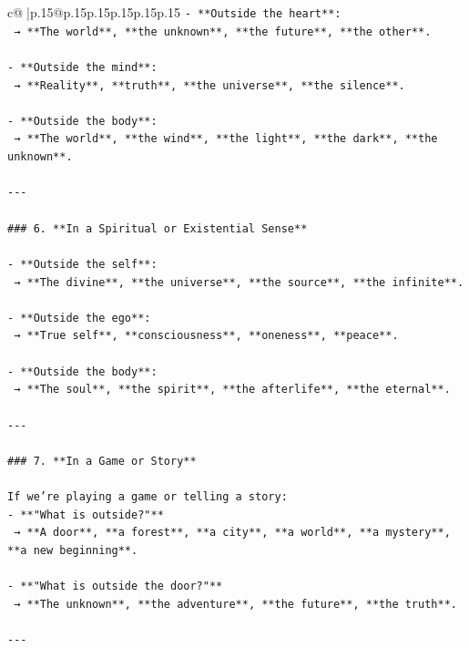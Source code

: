 \documentclass{article}
\begin{document}
{\begin{supertabular}{c@{$\;$}|p{.15\linewidth}@{}p{.15\linewidth}p{.15\linewidth}p{.15\linewidth}p{.15\linewidth}p{.15\linewidth}}
{{{\texttt{{-} **Outside the heart**:  } \\
\texttt{  → **The world**, **the unknown**, **the future**, **the other**.} \\
\\ 
\texttt{{-} **Outside the mind**:  } \\
\texttt{  → **Reality**, **truth**, **the universe**, **the silence**.} \\
\\ 
\texttt{{-} **Outside the body**:  } \\
\texttt{  → **The world**, **the wind**, **the light**, **the dark**, **the unknown**.} \\
\\ 
\texttt{{-}{-}{-}} \\
\\ 
\texttt{\#\#\# 6. **In a Spiritual or Existential Sense**} \\
\\ 
\texttt{{-} **Outside the self**:  } \\
\texttt{  → **The divine**, **the universe**, **the source**, **the infinite**.} \\
\\ 
\texttt{{-} **Outside the ego**:  } \\
\texttt{  → **True self**, **consciousness**, **oneness**, **peace**.} \\
\\ 
\texttt{{-} **Outside the body**:  } \\
\texttt{  → **The soul**, **the spirit**, **the afterlife**, **the eternal**.} \\
\\ 
\texttt{{-}{-}{-}} \\
\\ 
\texttt{\#\#\# 7. **In a Game or Story**} \\
\\ 
\texttt{If we’re playing a game or telling a story:} \\
\texttt{{-} **"What is outside?"**  } \\
\texttt{  → **A door**, **a forest**, **a city**, **a world**, **a mystery**, **a new beginning**.} \\
\\ 
\texttt{{-} **"What is outside the door?"**  } \\
\texttt{  → **The unknown**, **the adventure**, **the future**, **the truth**.} \\
\\ 
\texttt{{-}{-}{-}} \\
}}}
\end{supertabular}}
\end{document}
